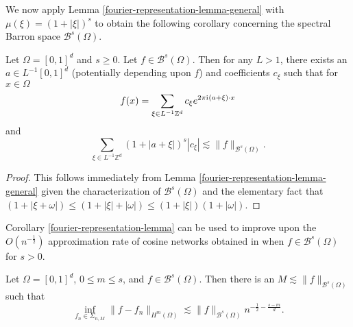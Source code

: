 We now apply Lemma \ref{fourier-representation-lemma-general} with $\mu(\xi) = (1 + |\xi|)^s$ to obtain the following corollary concerning the spectral Barron space $\mathcal{B}^s(\Omega)$.
\begin{corollary}\label{fourier-representation-lemma}
 Let $\Omega = [0,1]^d$ and $s \geq 0$. Let $f\in \mathcal{B}^s(\Omega)$. Then for any $L > 1$, there exists an $a\in L^{-1}[0,1]^d$ (potentially depending upon $f$) and coefficients $c_\xi$ such that
 for $x\in \Omega$
 \begin{equation}
  f(x) = \sum_{\xi\in L^{-1}\mathbb{Z}^d}c_\xi e^{2\pi {\mathrm{i}\mkern1mu}  (a+\xi)\cdot x}
 \end{equation}
 and
 \begin{equation}
  \sum_{\xi\in L^{-1}\mathbb{Z}^d} (1+|a+\xi|)^s|c_\xi| \lesssim \|f\|_{\mathcal{B}^s(\Omega)}.
 \end{equation}

\end{corollary}
\begin{proof}
 This follows immediately from Lemma \ref{fourier-representation-lemma-general} given the characterization of $\mathcal{B}^s(\Omega)$ and the elementary fact that $(1 + |\xi + \omega|)\leq (1 + |\xi| + |\omega|) \leq (1 + |\xi|)(1 + |\omega|)$.
\end{proof}


Corollary \ref{fourier-representation-lemma} can be used to improve upon the $O(n^{-\frac{1}{2}})$ approximation rate of cosine networks obtained in \cite{jones1992simple} when $f\in \mathcal{B}^s(\Omega)$ for $s > 0$.

\begin{theorem}\label{approximation-rate-theorem}
 Let $\Omega = [0,1]^d$, $0\leq m\leq s$, and $f\in \mathcal{B}^s(\Omega)$. Then there is an $M\lesssim \|f\|_{\mathcal{B}^s(\Omega)}$ such that
 \begin{equation}
  \inf_{f_n\in \Sigma_{n,M}} \|f-f_n\|_{H^m(\Omega)} \lesssim \|f\|_{\mathcal{B}^s(\Omega)}n^{-\frac{1}{2} - \frac{s-m}{d}}.
 \end{equation}

\end{theorem}

